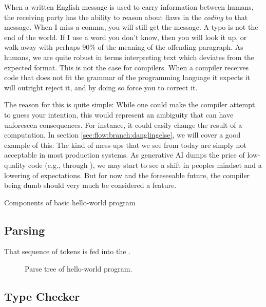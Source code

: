When a written English message is used to carry information between humans, the receiving party has the ability to reason about flaws in the \textsl{coding} to that message. When I miss a comma, you will still get the message. A typo is not the end of the world. If I use a word you don't know, then you will look it up, or walk away with perhaps 90\% of the meaning of the offending paragraph. As humans, we are quite robust in terms interpreting text which deviates from the expected format. This is not the case for compilers. When a compiler receives code that does not fit the grammar of the programming language it expects it will outright reject it, and by doing so force you to correct it.

The reason for this is quite simple: While one could make the compiler attempt to guess your intention, this would represent an ambiguity that can have unforeseen consequences. For instance, it could easily change the result of a computation. In section \ref{sec:flow:branch:danglingelse}, we will cover a good example of this. The kind of mess-ups that we see from  today are simply not acceptable in most production systems. As generative AI dumps the price of low-quality code (e.g., through ), we may start to see a shift in peoples mindset and a lowering of expectations. But for now and the foreseeable future, the compiler being dumb should very much be considered a feature.


\begin{syntaxfloat}
  
  \caption{Components of basic hello-world program}
  \label{syntax:first:hello}
\end{syntaxfloat}

\subsection{Parsing}

That sequence of tokens is fed into the .

\begin{figure}[tbp]
  
  \caption{Parse tree of hello-world program.}
  \label{fig:first:hello:parsetree}
\end{figure}

\subsection{Type Checker}

